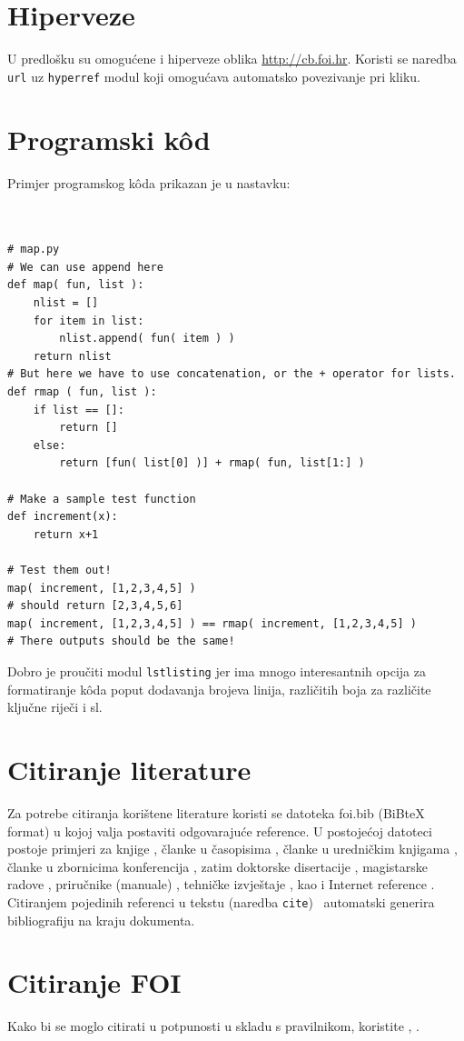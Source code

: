 \documentclass[a4paper,12pt]{foi}
\begin{document}
\chapter{Hiperveze}

U predlo\v{s}ku su omogu\'{c}ene i hiperveze oblika \url{http://cb.foi.hr}. Koristi se naredba \texttt{url} uz \texttt{hyperref} modul koji omogućava automatsko povezivanje pri kliku.

\chapter{Programski k\^{o}d}

Primjer programskog k\^{o}da prikazan je u nastavku:

\begin{verbatim}


# map.py
# We can use append here
def map( fun, list ):
    nlist = []
    for item in list:
        nlist.append( fun( item ) )
    return nlist
# But here we have to use concatenation, or the + operator for lists.
def rmap ( fun, list ):
    if list == []:
        return []
    else:
        return [fun( list[0] )] + rmap( fun, list[1:] )

# Make a sample test function
def increment(x):
    return x+1

# Test them out!
map( increment, [1,2,3,4,5] )
# should return [2,3,4,5,6]
map( increment, [1,2,3,4,5] ) == rmap( increment, [1,2,3,4,5] )
# There outputs should be the same!
\end{verbatim}

Dobro je proučiti modul \texttt{lstlisting} jer ima mnogo interesantnih opcija za formatiranje k\^{o}da poput dodavanja brojeva linija, različitih boja za različite ključne riječi i sl.

\chapter{Citiranje literature}

Za potrebe citiranja kori\v{s}tene literature koristi se datoteka foi.bib (BiBteX format) u kojoj valja postaviti odgovaraju\'{c}e reference. U postoje\'{c}oj datoteci postoje primjeri za knjige \cite{Baral2004, Jennex2007, JohsansenSwigart2000, PogacnikBloom1998}, \v{c}lanke u \v{c}asopisima \cite{BacaEtAl2007, Jurin2006}, \v{c}lanke u uredni\v{c}kim knjigama \cite{Garzarelli2004, Luhmann2003}, \v{c}lanke u zbornicima konferencija \cite{AbeleBischoff2001, BacaEtAl2006}, zatim doktorske disertacije \cite{Bahr2009}, magistarske radove \cite{Schatten2008}, priru\v{c}nike (manuale) \cite{HAZU2004}, tehni\v{c}ke izvje\v{s}taje \cite{BlonkEtAll1998}, kao i Internet reference \cite{Berger2006, Pilgrim2006}. Citiranjem pojedinih referenci u tekstu (naredba \texttt{cite}) \LaTeXe\ automatski generira bibliografiju na kraju dokumenta.

\chapter{Citiranje FOI }
Kako bi se moglo citirati u potpunosti u skladu s pravilnikom, koristite , . 




\listoffigures
\end{document}
